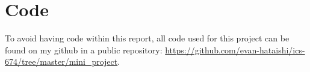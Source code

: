 
\section{Code}

To avoid having code within this report, all code used for this project can be found on my github in a public repository: \url{https://github.com/evan-hataishi/ics-674/tree/master/mini_project}.
